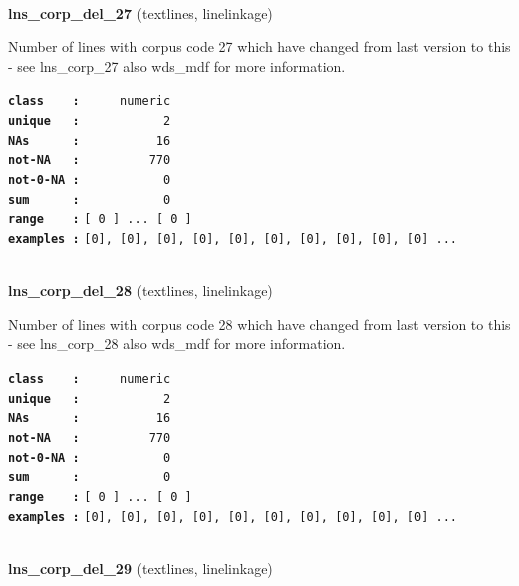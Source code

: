 \documentclass[]{article}
\begin{document}
~

\textbf{lns\_corp\_del\_27} (textlines, linelinkage)

Number of lines with corpus code 27 which have changed from last version
to this - see lns\_corp\_27 also wds\_mdf for more information.

\textbf{\texttt{class\ \ \ \ :}} \texttt{~~~~~numeric}\\
\textbf{\texttt{unique\ \ \ :}} \texttt{~~~~~~~~~~~2}\\
\textbf{\texttt{NAs\ \ \ \ \ \ :}} \texttt{~~~~~~~~~~16}\\
\textbf{\texttt{not-NA\ \ \ :}} \texttt{~~~~~~~~~770}\\
\textbf{\texttt{not-0-NA\ :}} \texttt{~~~~~~~~~~~0}\\
\textbf{\texttt{sum\ \ \ \ \ \ :}} \texttt{~~~~~~~~~~~0}\\
\textbf{\texttt{range\ \ \ \ :}}
\texttt{{[}\ 0\ {]}\ ...\ {[}\ 0\ {]}}\\
\textbf{\texttt{examples\ :}}
\texttt{{[}0{]},\ {[}0{]},\ {[}0{]},\ {[}0{]},\ {[}0{]},\ {[}0{]},\ {[}0{]},\ {[}0{]},\ {[}0{]},\ {[}0{]}\ ...}\\

~

\textbf{lns\_corp\_del\_28} (textlines, linelinkage)

Number of lines with corpus code 28 which have changed from last version
to this - see lns\_corp\_28 also wds\_mdf for more information.

\textbf{\texttt{class\ \ \ \ :}} \texttt{~~~~~numeric}\\
\textbf{\texttt{unique\ \ \ :}} \texttt{~~~~~~~~~~~2}\\
\textbf{\texttt{NAs\ \ \ \ \ \ :}} \texttt{~~~~~~~~~~16}\\
\textbf{\texttt{not-NA\ \ \ :}} \texttt{~~~~~~~~~770}\\
\textbf{\texttt{not-0-NA\ :}} \texttt{~~~~~~~~~~~0}\\
\textbf{\texttt{sum\ \ \ \ \ \ :}} \texttt{~~~~~~~~~~~0}\\
\textbf{\texttt{range\ \ \ \ :}}
\texttt{{[}\ 0\ {]}\ ...\ {[}\ 0\ {]}}\\
\textbf{\texttt{examples\ :}}
\texttt{{[}0{]},\ {[}0{]},\ {[}0{]},\ {[}0{]},\ {[}0{]},\ {[}0{]},\ {[}0{]},\ {[}0{]},\ {[}0{]},\ {[}0{]}\ ...}\\

~

\textbf{lns\_corp\_del\_29} (textlines, linelinkage)
\end{document}
